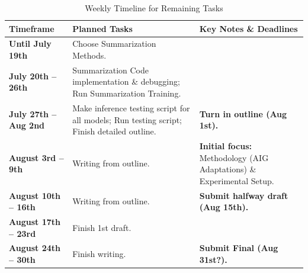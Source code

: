\documentclass[paper=a4, fontsize=11pt]{scrartcl} %
\numberwithin{equation}{section} %
\numberwithin{figure}{section} %
\numberwithin{table}{section} %
\begin{document}




\vspace{1cm} %

\begin{table}[htbp]
\centering
\caption{Weekly Timeline for Remaining Tasks}
\label{tab:timeline}
\begin{tabular}{@{}lp{8.0cm}p{4.0cm}@{}}
\toprule
\textbf{Timeframe} & \textbf{Planned Tasks} & \textbf{Key Notes \& Deadlines} \\
\midrule
\textbf{Until July 19th} & Choose Summarization Methods. & \\
\addlinespace
\textbf{July 20th -- 26th} & Summarization Code implementation \& debugging; Run Summarization Training. & \\
\addlinespace
\textbf{July 27th -- Aug 2nd} & Make inference testing script for all models; Run testing script; Finish detailed outline. & \textbf{Turn in outline (Aug 1st).} \\
\addlinespace
\textbf{August 3rd -- 9th} & Writing from outline. & \textbf{Initial focus:} Methodology (AIG Adaptations) \& Experimental Setup. \\
\addlinespace
\textbf{August 10th -- 16th} & Writing from outline. & \textbf{Submit halfway draft (Aug 15th).} \\
\addlinespace
\textbf{August 17th -- 23rd} & Finish 1st draft. & \\
\addlinespace
\textbf{August 24th -- 30th} & Finish writing. & \textbf{Submit Final (Aug 31st?).} \\
\bottomrule
\end{tabular}
\end{table}
\end{document}
